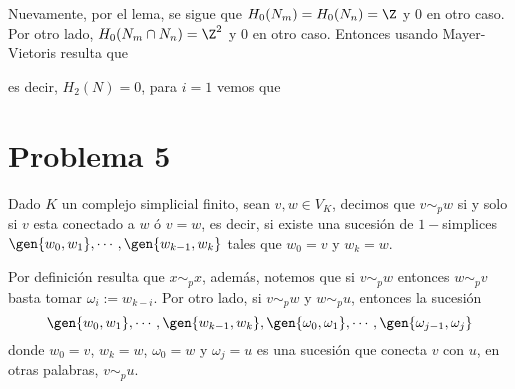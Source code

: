\documentclass{article}
\begin{document}
\begin{enumerate}
\begin{center}
    \end{center}
    Nuevamente, por el lema, se sigue que $H_{0}(N_{m})=H_{0}(N_{n})=\Z$ y $0$ en otro caso. 
    Por otro lado, $H_{0}(N_{m}\cap N_{n})=\Z^{2}$ y $0$ en otro caso. Entonces usando 
    Mayer-Vietoris resulta que

    \vspace{2mm}
    \centerline{
    }
    \vspace{1mm}
    es decir, $H_{2}(N)=0$, para $i=1$ vemos que

    \vspace{2mm}
    \centerline{
    }
\end{enumerate}

\section*{Problema 5}
\noindent Dado $K$ un complejo simplicial finito, sean $v,w\in V_{K}$, decimos que $v\sim_{p}w$ si
y solo si $v$ esta conectado a $w$ ó $v=w$, es decir, si existe una sucesión de $1-$simplices
$\gen{w_{0},w_{1}},\cdots,\gen{w_{k-1},w_{k}}$ tales que $w_{0}=v$ y $w_{k}=w$. 

\vspace{1mm}
\noindent Por definición resulta que $x\sim_{p}x$, además, notemos que si $v\sim_{p}w$ entonces 
$w\sim_{p}v$ basta tomar $\omega_{i}:=w_{k-i}$. Por otro lado, si $v\sim_{p}w$ y $w\sim_{p}u$, 
entonces la sucesión
\begin{equation*}
    \gen{w_{0},w_{1}},\cdots,\gen{w_{k-1},w_{k}},\gen{\omega_{0},\omega_{1}},\cdots,
    \gen{\omega_{j-1},\omega_{j}}
\end{equation*}
donde $w_{0}=v$, $w_{k}=w$, $\omega_{0}=w$ y $\omega_{j}=u$ es una sucesión que conecta $v$ con 
$u$, en otras palabras, $v\sim_{p}u$.
\end{document}
